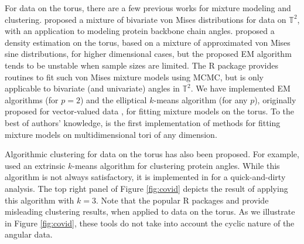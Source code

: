  For data on the torus, there are a few previous works for mixture modeling and clustering. \citet{Mardia:2007} proposed a mixture of bivariate von Mises distributions for data on $\mathbb{T}^2$, with an application to modeling protein backbone chain angles. \citet{Mardia:2012} proposed a density estimation on the torus, based on a mixture of approximated von Mises sine distributions, for higher dimensional cases, but the proposed EM algorithm tends to be unstable when sample sizes are limited. The R package  \citep{Chakraborty:2019,BAMBI} provides routines to fit such von Mises mixture models using MCMC, but is only applicable to bivariate (and univariate) angles in $\mathbb{T}^2$. We have implemented EM algorithms (for $p=2$) and the elliptical $k$-means algorithm (for any $p$), originally proposed for vector-valued data \citep{Sung:1998,Bishop,Shin:2019}, for fitting mixture models on the torus. To the best of authors' knowledge,  is the first implementation of methods for fitting mixture models on multidimensional tori of any dimension. 

 Algorithmic clustering for data on the torus has also been proposed. For example,
 \citet{Gao:2018} used an extrinsic $k$-means algorithm for clustering protein angles. While this algorithm is not always satisfactory, it is implemented in  for a quick-and-dirty analysis. The top right panel of Figure \ref{fig:covid} depicts the result of applying this algorithm with $k = 3$. Note that the popular R packages  \citep{mixtools} and  \citep{mclust} provide misleading clustering results, when applied to data on the torus.  As we illustrate in Figure \ref{fig:covid}, these tools do not take into account the cyclic nature of the angular data.

